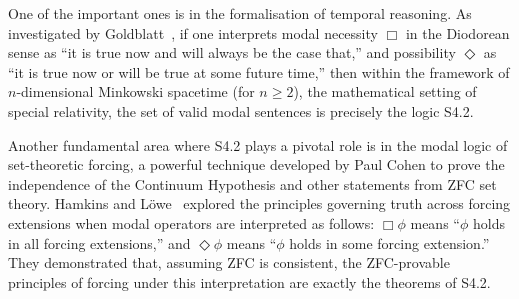 \documentclass{article}
\theoremstyle{definition}
\begin{document}
One of the important ones is in the formalisation of temporal reasoning. As investigated by Goldblatt~\cite{Goldblatt1980:Diodorean}, if one interprets modal necessity $\Box$ in the Diodorean sense as ``it is true now and will always be the case that,'' and possibility $\Diamond$ as ``it is true now or will be true at some future time,'' then within the framework of $n$-dimensional Minkowski spacetime (for $n \geq 2$), the mathematical setting of special relativity, the set of valid modal sentences is precisely the logic S4.2. %

Another fundamental area where S4.2 plays a pivotal role is in the modal logic of set-theoretic forcing, a powerful technique developed by Paul Cohen to prove the independence of the Continuum Hypothesis and other statements from ZFC set theory. Hamkins and L\"owe~\cite{Hamkins2008:ModalForcing} explored the principles governing truth across forcing extensions when modal operators are interpreted as follows: $\Box\phi$ means ``$\phi$ holds in all forcing extensions,'' and $\Diamond\phi$ means ``$\phi$ holds in some forcing extension.'' They demonstrated that, assuming ZFC is consistent, the ZFC-provable principles of forcing under this interpretation are exactly the theorems of S4.2. %
\end{document}
